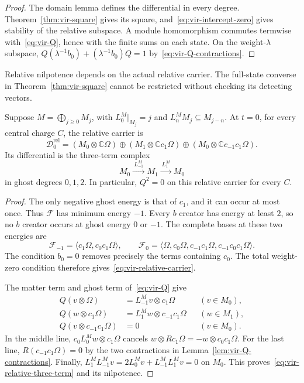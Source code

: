 \begin{proof}
The domain lemma defines the differential in every degree.
Theorem~\ref{thm:vir-square} gives its square, and~\eqref{eq:vir-intercept-zero} gives stability of the relative subspace.
A module homomorphism commutes termwise with~\eqref{eq:vir-Q}, hence with the finite sums on each state.
On the weight-$\lambda$ subspace,
$Q(\lambda^{-1}b_0)+(\lambda^{-1}b_0)Q=1$ by~\eqref{eq:vir-Q-contractions}.
\end{proof}

Relative nilpotence depends on the actual relative carrier.
The full-state converse in Theorem~\ref{thm:vir-square} cannot be restricted without checking its detecting vectors.

\begin{proposition}\label{prop:vir-relative-three-term}
Suppose $M=\bigoplus_{j\geq0}M_j$, with $L_0^M|_{M_j}=j$ and $L_n^MM_j\subseteq M_{j-n}$.
At $t=0$, for every central charge $C$, the relative carrier is
\begin{equation}\label{eq:vir-relative-carrier}
 \mathcal D_0^{\mathrm{rel}}
 =(M_0\otimes\mathbb C\Omega)
 \oplus(M_1\otimes\mathbb Cc_1\Omega)
 \oplus(M_0\otimes\mathbb Cc_{-1}c_1\Omega).
\end{equation}
Its differential is the three-term complex
\begin{equation}\label{eq:vir-relative-three-term}
 M_0\xrightarrow{\ L_{-1}^M\ } M_1
 \xrightarrow{\ L_1^M\ }M_0
\end{equation}
in ghost degrees $0,1,2$.
In particular, $Q^2=0$ on this relative carrier for every $C$.
\end{proposition}

\begin{proof}
The only negative ghost energy is that of $c_1$, and it can occur at most once.
Thus $\mathcal F$ has minimum energy $-1$.
Every $b$ creator has energy at least $2$, so no $b$ creator occurs at ghost energy $0$ or $-1$.
The complete bases at these two energies are
\[
 \mathcal F_{-1}=\langle c_1\Omega,c_0c_1\Omega\rangle,
 \qquad
 \mathcal F_0=\langle\Omega,c_0\Omega,c_{-1}c_1\Omega,c_{-1}c_0c_1\Omega\rangle.
\]
The condition $b_0=0$ removes precisely the terms containing $c_0$.
The total weight-zero condition therefore gives~\eqref{eq:vir-relative-carrier}.

The matter term and ghost term of~\eqref{eq:vir-Q} give
\begin{align*}
 Q(v\otimes\Omega)&=L_{-1}^Mv\otimes c_1\Omega &&(v\in M_0),\\
 Q(w\otimes c_1\Omega)&=L_1^Mw\otimes c_{-1}c_1\Omega &&(w\in M_1),\\
 Q(v\otimes c_{-1}c_1\Omega)&=0 &&(v\in M_0).
\end{align*}
In the middle line, $c_0L_0^Mw\otimes c_1\Omega$ cancels $w\otimes Rc_1\Omega=-w\otimes c_0c_1\Omega$.
For the last line, $R(c_{-1}c_1\Omega)=0$ by the two contractions in Lemma~\ref{lem:vir-Q-contractions}.
Finally,
$L_1^ML_{-1}^Mv=2L_0^Mv+L_{-1}^ML_1^Mv=0$ on $M_0$.
This proves~\eqref{eq:vir-relative-three-term} and its nilpotence.
\end{proof}

